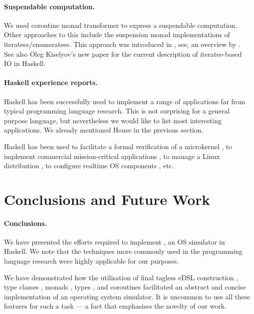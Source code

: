\paragraph{Suspendable computation.} We used coroutine monad transformer \cite{cmt} to express a suspendable computation.
Other approaches to this include the suspension monad implementations of iteratees/enumeratees. This approach was introduced in \cite{oleg-iteratee}, see, \eg an overview by \citeauthor{lato2010iteratee} \cite{lato2010iteratee}.
See also Oleg Kiselyov's new paper \cite{springerlink:10.1007/978-3-642-29822-6_15} for the current description of iteratee-based IO in Haskell.

\paragraph{Haskell experience reports.}
Haskell has been successfully used to implement a range of applications far from typical programming language research.
This is not surprising for a general purpose language, but nevertheless we would like to list most interesting applications.
We already mentioned House \cite{house} in the previous section.

Haskell has been used to facilitate a formal verification of a
microkernel \cite{Klein:2009:ERS:1631687.1596566}, to implement
commercial mission-critical applications
\cite{Sampson:2009:ERH:1631687.1596578}, to manage a Linux
distribution \cite{Beshers:2007:ERU:1291220.1291184}, to configure
realtime OS components \cite{Jones:2008:ERP:1411203.1411219}, etc.

\section{Conclusions and Future Work}
\label{sec:concl-future-work}

\paragraph{Conclusions.}
We have presented the efforts required to implement \soosim, an OS simulator in Haskell.
We note that the techniques more commonly used in the programming language research were highly applicable for our purposes.

We have demonstrated how the utilisation of final tagless eDSL construction \cite{final_tagless_embedding,Hofer:2008:PED:1449913.1449935}, type classes \cite{Hall:1996:TCH:227699.227700}, monads \cite{Wadler:1990:CM:91556.91592},  types \cite{Abadi:1991:DTS:103135.103138}, and coroutines \cite{coroutines,cmt} facilitated an abstract and concise implementation of an operating system simulator.
It is uncommon to use all these features for such a task --- a fact that emphasises the novelty of our work.

